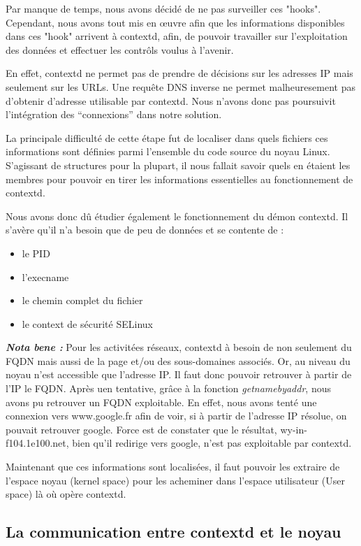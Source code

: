 \documentclass[pdftex,a4paper,titlepage,11pt]{article}
\begin{document}
Par manque de temps, nous avons décidé de ne pas surveiller ces "hooks". Cependant, nous avons tout mis en œuvre afin que les informations disponibles dans ces "hook" arrivent à contextd, afin, de pouvoir travailler sur l'exploitation des données et effectuer les contrôls voulus à l'avenir.

En effet, contextd ne permet pas de prendre de décisions sur les adresses IP mais seulement sur les URLs. Une requête DNS inverse ne permet malheuresement pas d'obtenir d'adresse utilisable par contextd. Nous n'avons donc pas poursuivit l'intégration des ``connexions'' dans notre solution.

La principale difficulté de cette étape fut de localiser dans quels fichiers ces informations sont définies parmi l'ensemble du code source du noyau Linux. S'agissant de structures pour la plupart, il nous fallait savoir quels en étaient les membres pour pouvoir en tirer les informations essentielles au fonctionnement de contextd.

Nous avons donc dû étudier également le fonctionnement du démon contextd. Il s'avère qu'il n'a besoin que de peu de données et se contente de :
	\begin{itemize}
		\item le PID
		\item l'execname
		\item le chemin complet du fichier
		\item le context de sécurité SELinux~\\
	\end{itemize}
	
\textit{\textsl{\textbf{Nota bene :}}} Pour les activitées réseaux, contextd à besoin de non seulement du FQDN mais aussi de la page et/ou des sous-domaines associés. Or, au niveau du noyau n'est accessible que l'adresse IP. Il faut donc pouvoir retrouver à partir de l'IP le FQDN. Après uen tentative, grâce à la fonction \textit{getnamebyaddr}, nous avons pu retrouver un FQDN exploitable. En effet, nous avons tenté une connexion vers www.google.fr afin de voir, si à partir de l'adresse IP résolue, on pouvait retrouver google. Force est de constater que le résultat, wy-in-f104.1e100.net, bien qu'il redirige vers google, n'est pas exploitable par contextd.

Maintenant que ces informations sont localisées, il faut pouvoir les extraire de l'espace noyau (kernel space) pour les acheminer dans l'espace utilisateur (User space) là où opère contextd. 

\subsection{La communication entre contextd et le noyau}
\end{document}
